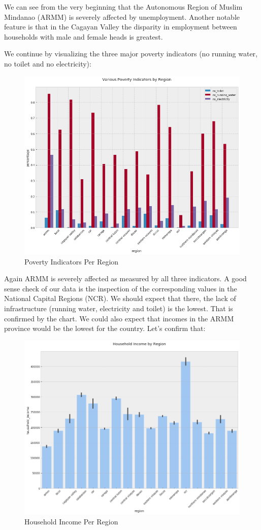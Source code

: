 \documentclass{article}
\begin{document}
We can see from the very beginning that the Autonomous Region of Muslim Mindanao (ARMM) is severely affected by unemployment. Another notable feature is that in the Cagayan Valley the disparity in employment between households with male and female heads is greatest.

We continue by visualizing the three major poverty indicators (no running water, no toilet and no electricity):

\begin{figure}[H]
\caption{Poverty Indicators Per Region}
\centering
\includegraphics[width = 0.7 \textwidth]{poverty_indicators_region}
\end{figure}

Again ARMM is severely affected as measured by all three indicators. A good sense check of our data is the inspection of the corresponding values in the National Capital Regions (NCR). We should expect that there, the lack of infrastructure (running water, electricity and toilet) is the lowest. That is confirmed by the chart. We could also expect that incomes in the ARMM province would be the lowest for the country. Let's confirm that:

\begin{figure}[H]
\caption{Household Income Per Region}
\centering
\includegraphics[width = 0.7 \textwidth]{household_income_region}
\end{figure}
\end{document}
